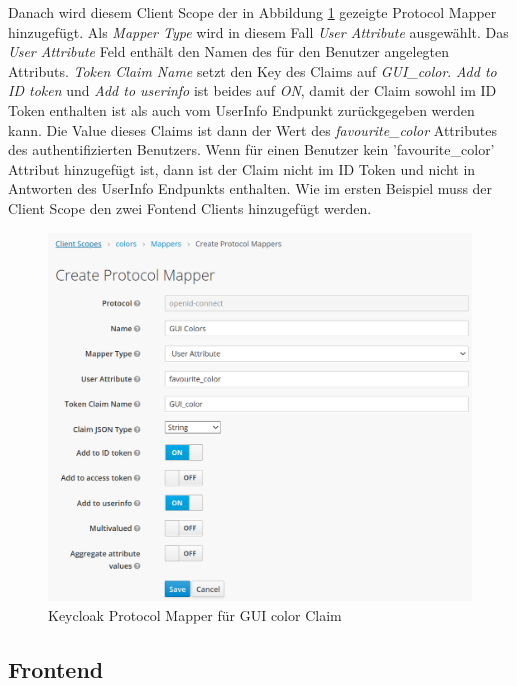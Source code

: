 Danach wird diesem Client Scope der in Abbildung \ref{fig:EB_Keycloak Protocol Mapper fuer GUI color Claim} gezeigte Protocol Mapper hinzugefügt. Als \textit{Mapper Type} wird in diesem Fall \textit{User Attribute} ausgewählt. Das \textit{User Attribute} Feld enthält den Namen des für den Benutzer angelegten Attributs. \textit{Token Claim Name} setzt den Key des Claims auf \textit{GUI\_color}. \textit{Add to ID token} und \textit{Add to userinfo} ist beides auf \textit{ON}, damit der Claim sowohl im ID Token enthalten ist als auch vom UserInfo Endpunkt zurückgegeben werden kann. Die Value dieses Claims ist dann der Wert des \textit{favourite\_color} Attributes des authentifizierten Benutzers. Wenn für einen Benutzer kein 'favourite\_color' Attribut hinzugefügt ist, dann ist der Claim nicht im ID Token und nicht in Antworten des UserInfo Endpunkts enthalten. Wie im ersten Beispiel muss der Client Scope den zwei Fontend Clients hinzugefügt werden.

\begin{figure}[!ht]
	\centering
	\includegraphics[width=1\textwidth]{Images/Ebert/KeycloakNewClaimProtocolMapper.PNG}
	\caption{Keycloak Protocol Mapper für GUI color Claim}
	\label{fig:EB_Keycloak Protocol Mapper fuer GUI color Claim}
\end{figure}



\subsection{Frontend}

